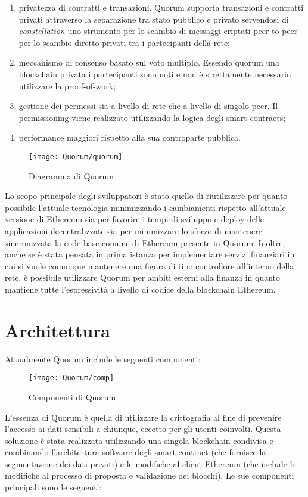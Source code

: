 \begin{enumerate}
	\item privatezza di contratti e transazioni. Quorum supporta transazioni e contratti privati attraverso la separazione tra stato pubblico e privato servendosi di \emph{constellation} uno strumento per lo scambio di messaggi criptati peer-to-peer per lo scambio diretto privati tra i partecipanti della rete;
	\item meccanismo di consenso basato sul voto multiplo. Essendo quorum una blockchain privata i partecipanti sono noti e non è strettamente necessario utilizzare la proof-of-work;
	\item gestione dei permessi sia a livello di rete che a livello di singolo peer. Il permissioning viene realizzato utilizzando la logica degli smart contracts;
	\item performance maggiori rispetto alla sua controparte pubblica.
\end{enumerate}%
%
\begin{figure}[H]
	\centering
	\texttt{[image: Quorum/quorum]}
	\caption{Diagramma di Quorum}
	\label{fig:diagramma di quorum}
\end{figure}
%
Lo scopo principale degli sviluppatori è stato quello di riutilizzare per quanto possibile l'attuale tecnologia minimizzando i cambiamenti rispetto all'attuale versione di Ethereum sia per favorire i tempi di sviluppo e deploy delle applicazioni decentralizzate sia per minimizzare lo sforzo di mantenere sincronizzata la code-base comune di Ethereum presente in Quorum. Inoltre, anche se è stata pensata in prima istanza per implementare servizi finanziari in cui si vuole comunque mantenere una figura di tipo controllore all'interno della rete, è possibile utilizzare Quorum per ambiti esterni alla finanza in quanto mantiene tutte l'espressività a livello di codice della blockchain Ethereum.
%
\section{Architettura}
%
Attualmente Quorum include le seguenti componenti:
%
\begin{figure}[H]
	\centering
	\texttt{[image: Quorum/comp]}
	\caption{Componenti di Quorum}
	\label{fig:componenti di quorum}
\end{figure}
%
L'essenza di Quorum è quella di utilizzare la crittografia al fine di prevenire l'accesso ai dati sensibili a chiunque, eccetto per gli utenti coinvolti. Questa soluzione è stata realizzata utilizzando una singola blockchain condivisa e combinando l'architettura software degli smart contract (che fornisce la segmentazione dei dati privati) e le modifiche al client Ethereum (che include le modifiche al processo di proposta e validazione dei blocchi). Le sue componenti principali sono le seguenti:
%
